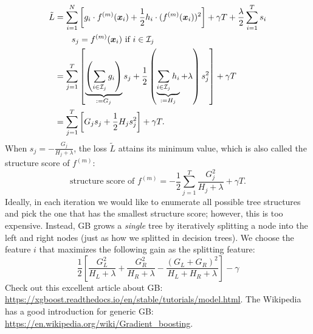             \begin{equation}
                \begin{aligned}
                    \tilde{L} & = \sum_{i=1}^{N}{
                        \left[
                            g_i \cdot f^{(m)}(\bm{x}_i) + \frac{1}{2} h_i \cdot (f^{(m)}(\bm{x}_i))^2 
                        \right] + \gamma T + \frac{\lambda}{2}\sum_{i=1}^{T}{s_i}
                    } \\
                    & \quad \quad \text{$s_j = f^{(m)}(\bm{x}_i)$ if $i \in \mathcal{I}_j$} \\
                    & = \sum_{j=1}^{T}{
                        \left[ \underbrace{\left(\sum_{i \in \mathcal{I}_j}^{}{g_i} \right)}_{:=G_j} s_j + \frac{1}{2}\left( \underbrace{\sum_{i \in \mathcal{I}_j}^{}{h_i}}_{:=H_j} + \lambda \right)s_j^2
                        \right] + \gamma T 
                    } \\
                    & = \sum_{j=1}^{T}{ \left[ G_j s_j + \frac{1}{2} H_j s_j^2 \right] } + \gamma T.
                \end{aligned}
            \end{equation}
        When $s_j = -\frac{G_j}{H_j + \lambda}$, the loss $\tilde{L}$ attains its minimum value, which is also called the structure score of $f^{(m)}$:
            \begin{equation}
                \text{structure score of $f^{(m)}$}= -\frac{1}{2}\sum_{j=1}^{T}{\frac{G_j^2}{H_j + \lambda}} + \gamma T.
            \end{equation}
        Ideally, in each iteration we would like to enumerate all possible tree structures and pick the one that has the smallest structure score; however, this is too expensive.
        Instead, GB grows a \emph{single} tree by iteratively splitting a node into the left and right nodes (just as how we splitted in decision trees).
        We choose the feature $i$ that maximizes the following gain as the splitting feature:
            \begin{equation}
                \frac{1}{2}\left[ \frac{G_L^2}{H_L + \lambda} + \frac{G_R^2}{H_R + \lambda} - \frac{(G_L + G_R)^2}{H_L +  H_R + \lambda}  \right] - \gamma
            \end{equation}
        Check out this excellent article about GB: \url{https://xgboost.readthedocs.io/en/stable/tutorials/model.html}.
        The Wikipedia has a good introduction for generic GB: \url{https://en.wikipedia.org/wiki/Gradient_boosting}.
        
